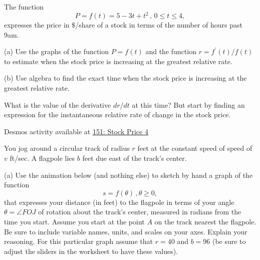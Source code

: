 \documentclass{ximera}
\begin{document}
\begin{question}  \label{Q:dfgt4tnhy}
The function 
\[
      P = f(t) = 5 -3t + t^2 \, , \, 0\leq t \leq 4 , 
\]
expresses the price in $\$$/share of a stock in terms of the number of hours past 9am.

(a) Use the graphs of the function $P=f(t)$ and the function $r=f^\prime(t)/f(t)$  to estimate when the stock price is increasing at the greatest relative rate.

(b) Use algebra to find the exact time when the stock price is increasing at the greatest relative rate.
\begin{hint}
What is the value of the derivative $dr/dt$ at this time? But start by finding an expression for the instantaneous relative rate of change in the stock price.
\end{hint}


\begin{onlineOnly}
    \begin{center}
\end{center}
\end{onlineOnly}

Desmos activity available at \href{https://www.desmos.com/calculator/xuupp3srqv}{151: Stock Price 4}

\end{question}


\begin{question}  \label{Qdgvbjuhjyhu}
You jog around a circular track of radius $r$ feet at the constant speed of speed of $v$ ft/sec. A flagpole lies $b$ feet due east of the track's center.

(a) Use the animation below (and nothing else) to sketch by hand a graph of the function 
\[
   s = f(\theta) \, , \theta \geq 0,
\]
that expresses your distance (in feet) to the flagpole in terms of your angle $\theta = \angle FOJ$ of rotation about the track's center, measured in radians from the time you start. Assume you start at the point $A$ on the track nearest the flagpole. Be sure to include variable names, units, and scales on your axes. Explain your reasoning. For this particular graph assume that $r=40$ and $b=96$ (be sure to adjust the sliders in the worksheet to have these values).

\begin{onlineOnly}
    \begin{center}
\end{center}
\end{onlineOnly}


\end{question}
\end{document}
